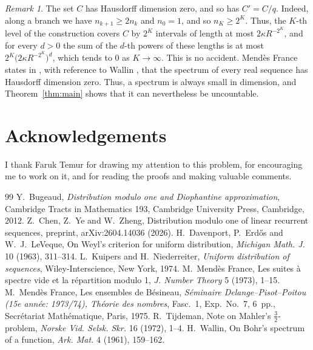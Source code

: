 \documentclass[11pt,reqno]{amsart}
\theoremstyle{definition}
\theoremstyle{remark}
\newtheorem{remark}[theorem]{Remark}
\numberwithin{equation}{section}
\begin{document}
\begin{remark}
The set $C$ has Hausdorff dimension zero, and so has $C'=C/q$. Indeed, along a branch we have $n_{k+1}\ge2n_k$ and $n_0=1$, and so $n_K\ge2^K$. Thus, the $K$-th level of the construction covers $C$ by $2^K$ intervals of length at most $2\kappa R^{-2^K}$, and for every $d>0$ the sum of the $d$-th powers of these lengths is at most $2^K\bigl(2\kappa R^{-2^K}\bigr)^d$, which tends to $0$ as $K\to\infty$. This is no accident. Mend\`es France states in \cite[Probl\`eme~5]{MF}, with reference to Wallin \cite{Wa}, that the spectrum of every real sequence has Hausdorff dimension zero. Thus, a spectrum is always small in dimension, and Theorem~\ref{thm:main} shows that it can nevertheless be uncountable.
\end{remark}

\section*{Acknowledgements}

I thank Faruk Temur for drawing my attention to this problem, for encouraging me to work on it, and for reading the proofs and making valuable comments.

\begin{thebibliography}{99}
 Y.~Bugeaud, \emph{Distribution modulo one and Diophantine approximation}, Cambridge Tracts in Mathematics 193, Cambridge University Press, Cambridge, 2012.
 Z.~Chen, Z.~Ye and W.~Zheng, Distribution modulo one of linear recurrent sequences, preprint, arXiv:2604.14036 (2026).
 H.~Davenport, P.~Erd\H os and W.~J.~LeVeque, On Weyl's criterion for uniform distribution, \emph{Michigan Math. J.} 10 (1963), 311--314.
 L.~Kuipers and H.~Niederreiter, \emph{Uniform distribution of sequences}, Wiley-Interscience, New York, 1974.
 M.~Mend\`es France, Les suites \`a spectre vide et la r\'epartition modulo 1, \emph{J. Number Theory} 5 (1973), 1--15.
 M.~Mend\`es France, Les ensembles de B\'esineau, \emph{S\'eminaire Delange--Pisot--Poitou (15e ann\'ee: 1973/74), Th\'eorie des nombres}, Fasc.~1, Exp.~No.~7, 6~pp., Secr\'etariat Math\'ematique, Paris, 1975.
 R.~Tijdeman, Note on Mahler's $\frac32$-problem, \emph{Norske Vid. Selsk. Skr.} 16 (1972), 1--4.
 H.~Wallin, On Bohr's spectrum of a function, \emph{Ark. Mat.} 4 (1961), 159--162.
\end{thebibliography}
\end{document}
